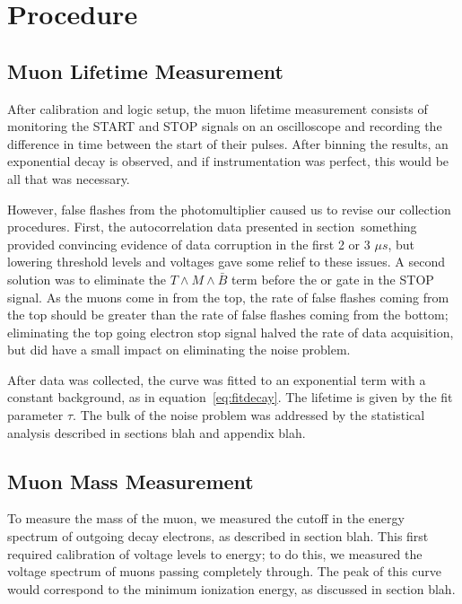 \section{Procedure}\label{procedure}

\subsection{Muon Lifetime Measurement}
\label{muonlifetimemeasurement}

After calibration and logic setup, the muon lifetime measurement consists of monitoring the START and STOP signals on an oscilloscope and recording the difference in time between the start of their pulses. After binning the results, an exponential decay is observed, and if instrumentation was perfect, this would be all that was necessary.

However, false flashes from the photomultiplier caused us to revise our collection procedures. First, the autocorrelation data presented in section~something provided convincing evidence of data corruption in the first 2 or 3 $\mu s$, but lowering threshold levels and voltages gave some relief to these issues. A second solution was to eliminate the $T \wedge M \wedge \bar{B}$ term before the or gate in the STOP signal. As the muons come in from the top, the rate of false flashes coming from the top should be greater than the rate of false flashes coming from the bottom; eliminating the top going electron stop signal halved the rate of data acquisition, but did have a small impact on eliminating the noise problem. 

After data was collected, the curve was fitted to an exponential term with a constant background, as in equation~\eqref{eq:fitdecay}. The lifetime is given by the fit parameter $\tau$. The bulk of the noise problem was addressed by the statistical analysis described in sections blah and appendix blah.

\subsection{Muon Mass Measurement}
\label{muonmassmeasurement}

To measure the mass of the muon, we measured the cutoff in the energy spectrum of outgoing decay electrons, as described in section blah. This first required calibration of voltage levels to energy; to do this, we measured the voltage spectrum of muons passing completely through. The peak of this curve would correspond to the minimum ionization energy, as discussed in section blah. 

